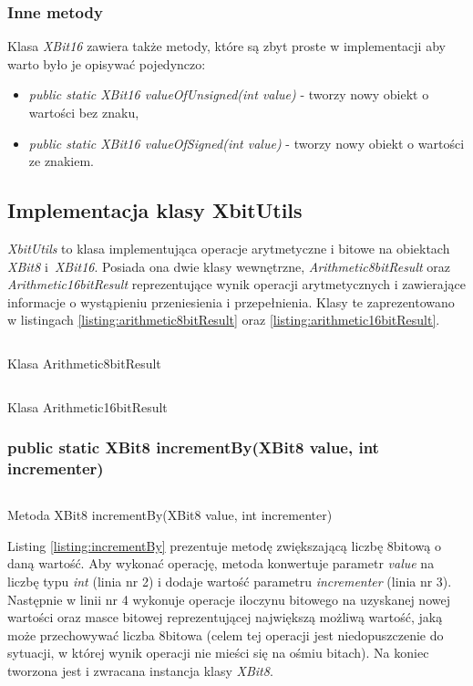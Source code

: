 \subsubsection{Inne metody}
Klasa \emph{XBit16} zawiera także metody, które są zbyt proste w implementacji aby warto było je opisywać pojedynczo:
\begin{itemize}  
	\item \emph{public static XBit16 valueOfUnsigned(int value)} - tworzy nowy obiekt o wartości bez znaku,
	\item \emph{public static XBit16 valueOfSigned(int value)} - tworzy nowy obiekt o wartości ze znakiem.
\end{itemize}


\subsection{Implementacja klasy XbitUtils}
\emph{XbitUtils} to klasa implementująca operacje arytmetyczne i bitowe na obiektach \emph{XBit8} i~\emph{XBit16}. Posiada ona dwie klasy wewnętrzne, \emph{Arithmetic8bitResult}  oraz \newline\emph{Arithmetic16bitResult} reprezentujące wynik operacji arytmetycznych i zawierające informacje o wystąpieniu przeniesienia i przepełnienia. Klasy te zaprezentowano w listingach \ref{listing:arithmetic8bitResult} oraz \ref{listing:arithmetic16bitResult}.

\begin{listing}[h]
	\inputminted{java}{listings/xbit/arithmetic8bitResult.java}
	\caption{Klasa Arithmetic8bitResult}
	\label{listing:arithmetic8bitResult}
\end{listing}

\begin{listing}[h]
	\inputminted{java}{listings/xbit/arithmetic16bitResult.java}
	\caption{Klasa Arithmetic16bitResult}
	\label{listing:arithmetic16bitResult}
\end{listing}

\subsubsection{public static XBit8 incrementBy(XBit8 value, int incrementer)}
\begin{listing}[h]
	\inputminted{java}{listings/xbit/incrementBy.java}
	\caption{Metoda XBit8 incrementBy(XBit8 value, int incrementer)}
	\label{listing:incrementBy}
\end{listing}
Listing \ref{listing:incrementBy} prezentuje metodę zwiększającą liczbę 8{\dywiz}bitową o daną wartość. Aby wykonać operację, metoda konwertuje parametr \emph{value} na liczbę typu \emph{int} (linia nr 2) i dodaje wartość parametru \emph{incrementer} (linia nr 3). Następnie w linii nr 4 wykonuje operacje iloczynu bitowego na uzyskanej nowej wartości oraz masce bitowej reprezentującej największą możliwą wartość, jaką może przechowywać liczba 8{\dywiz}bitowa (celem tej operacji jest niedopuszczenie do sytuacji, w której wynik operacji nie mieści się na ośmiu bitach). Na koniec tworzona jest i zwracana instancja klasy \emph{XBit8}. 

